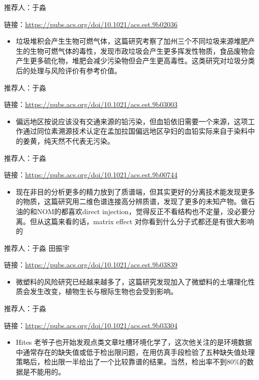 \documentclass[]{book}
\providecommand{\tightlist}{%
  \setlength{\itemsep}{0pt}\setlength{\parskip}{0pt}}
\begin{document}
推荐人：于淼

链接：\url{https://pubs.acs.org/doi/10.1021/acs.est.9b02036}

\begin{itemize}
\tightlist
\item
  垃圾堆积会产生生物可燃气体，这篇研究考察了加州三个不同垃圾来源堆肥产生的生物可燃气体的毒性，发现市政垃圾会产生更多挥发性物质，食品废物会产生更多硫化物，堆肥会减少污染物但会产生更高毒性。这类研究对垃圾分类后的处理与风险评价有参考价值。
\end{itemize}

推荐人：于淼

链接：\url{https://pubs.acs.org/doi/10.1021/acs.est.9b03003}

\begin{itemize}
\tightlist
\item
  偏远地区按说应该没有交通来源的铅污染，但血铅依旧需要一个来源，这项工作通过同位素溯源技术认定在孟加拉国偏远地区孕妇的血铅实际来自于染料中的姜黄，纯天然不代表无污染。
\end{itemize}

推荐人：于淼

链接：\url{https://pubs.acs.org/doi/10.1021/acs.est.9b00744}

\begin{itemize}
\tightlist
\item
  现在非目的分析更多的精力放到了质谱端，但其实更好的分离技术能发现更多的物质，这篇研究用二维色谱连接高分辨质谱，发现了更多的未知产物。做石油的和NOM的都喜欢direct injection，觉得反正不看结构也不定量，没必要分离。但从这篇来看的话，matrix effect 对你看到什么分子式都还是有很大影响的
\end{itemize}

推荐人：于淼 田振宇

链接：\url{https://pubs.acs.org/doi/10.1021/acs.est.9b03839}

\begin{itemize}
\tightlist
\item
  微塑料的风险研究已经越来越多了，这篇研究发现加入了微塑料的土壤理化性质会发生改变，植物生长与根际生物也会受到影响。
\end{itemize}

推荐人：于淼

链接：\url{https://pubs.acs.org/doi/10.1021/acs.est.9b03304}

\begin{itemize}
\tightlist
\item
  Hites 老爷子也开始发观点类文章吐槽环境化学了，这次他关注的是环境数据中通常存在的缺失值或低于检出限问题，在用仿真手段检验了五种缺失值处理策略后，检出限一半给出了一个比较靠谱的结果。当然，检出率不到80\%的数据是不能用的。
\end{itemize}
\end{document}
